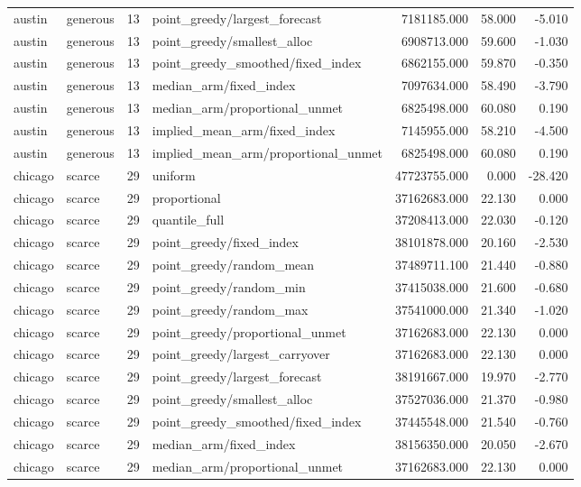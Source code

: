 \begin{tabular}{llrlrrr}
austin & generous & 13 & point\_greedy/largest\_forecast & 7181185.000 & 58.000 & -5.010 \\
austin & generous & 13 & point\_greedy/smallest\_alloc & 6908713.000 & 59.600 & -1.030 \\
austin & generous & 13 & point\_greedy\_smoothed/fixed\_index & 6862155.000 & 59.870 & -0.350 \\
austin & generous & 13 & median\_arm/fixed\_index & 7097634.000 & 58.490 & -3.790 \\
austin & generous & 13 & median\_arm/proportional\_unmet & 6825498.000 & 60.080 & 0.190 \\
austin & generous & 13 & implied\_mean\_arm/fixed\_index & 7145955.000 & 58.210 & -4.500 \\
austin & generous & 13 & implied\_mean\_arm/proportional\_unmet & 6825498.000 & 60.080 & 0.190 \\
chicago & scarce & 29 & uniform & 47723755.000 & 0.000 & -28.420 \\
chicago & scarce & 29 & proportional & 37162683.000 & 22.130 & 0.000 \\
chicago & scarce & 29 & quantile\_full & 37208413.000 & 22.030 & -0.120 \\
chicago & scarce & 29 & point\_greedy/fixed\_index & 38101878.000 & 20.160 & -2.530 \\
chicago & scarce & 29 & point\_greedy/random\_mean & 37489711.100 & 21.440 & -0.880 \\
chicago & scarce & 29 & point\_greedy/random\_min & 37415038.000 & 21.600 & -0.680 \\
chicago & scarce & 29 & point\_greedy/random\_max & 37541000.000 & 21.340 & -1.020 \\
chicago & scarce & 29 & point\_greedy/proportional\_unmet & 37162683.000 & 22.130 & 0.000 \\
chicago & scarce & 29 & point\_greedy/largest\_carryover & 37162683.000 & 22.130 & 0.000 \\
chicago & scarce & 29 & point\_greedy/largest\_forecast & 38191667.000 & 19.970 & -2.770 \\
chicago & scarce & 29 & point\_greedy/smallest\_alloc & 37527036.000 & 21.370 & -0.980 \\
chicago & scarce & 29 & point\_greedy\_smoothed/fixed\_index & 37445548.000 & 21.540 & -0.760 \\
chicago & scarce & 29 & median\_arm/fixed\_index & 38156350.000 & 20.050 & -2.670 \\
chicago & scarce & 29 & median\_arm/proportional\_unmet & 37162683.000 & 22.130 & 0.000 \\

\end{tabular}
